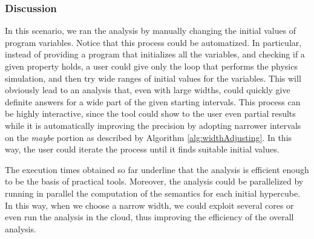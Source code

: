 \subsubsection{Discussion}
In this scenario, we ran the analysis by manually changing the initial values of program variables. Notice that this process could be automatized. In particular, instead of providing a program that initializes all the variables, and checking if a given property holds, a user could give only the  loop that performs the physics simulation, and then try wide ranges of initial values for the variables. This will obviously lead to an analysis that, even with large widths, could quickly give definite answers for a wide part of the given starting intervals. This process can be highly interactive, since the tool could show to the user even partial results while it is automatically improving the precision by adopting narrower intervals on the \emph{maybe} portion as described by Algorithm \ref{alg:widthAdjusting}. In this way, the user could iterate the process until it finds suitable initial values.

The execution times obtained so far underline that the analysis is efficient enough to be the basis of practical tools. Moreover, the analysis could be parallelized by running in parallel the computation of the semantics for each initial hypercube. In this way, when we choose a narrow width, we could exploit several cores or even run the analysis in the cloud, thus improving the efficiency of the overall analysis.

